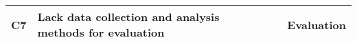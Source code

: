 \begin{table*}
\begin{tabular}{@{}lp{5.1cm}m{7.6cm}p{3.2cm}@{}}
                                \multirow{-4}{*}{\textbf{C7}} &   \multirow{-4}{*}{\parbox{4.5cm}{Lack data collection and analysis methods for evaluation}}                                                                              &  \cellcolor[HTML]{edf5f7}{C7-3: Insufficient support for collecting and analyzing viewers' watching behavior data}                                                                                      &     \multirow{-4.5}{*}{\parbox{2.5cm}{Evaluation}}                                                                                          \\
                                \bottomrule
\end{tabular}
\end{table*}